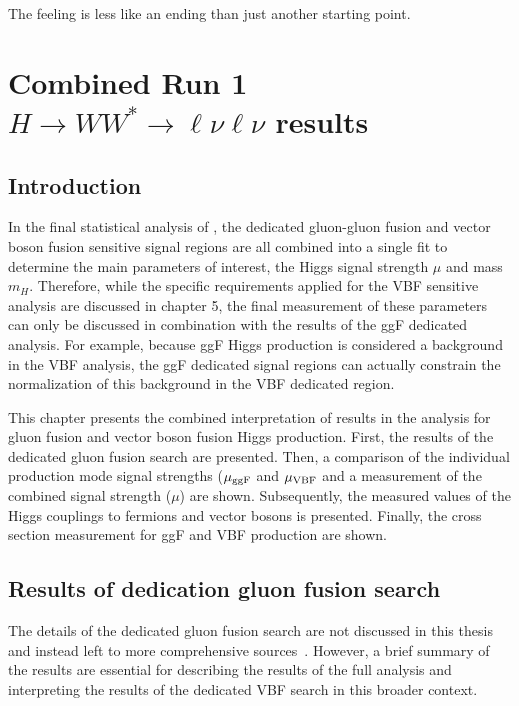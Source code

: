 \begin{savequote}[75mm]
The feeling is less like an ending than just another starting point.
\end{savequote}

\chapter{Combined Run 1 $H\rightarrow WW^{*}\rightarrow \ell\nu\ell\nu$ results}

\section{Introduction}

In the final statistical analysis of \HWWfull, the dedicated gluon-gluon fusion and vector boson fusion sensitive signal regions are all combined into a single fit to determine the main parameters of interest, the Higgs signal strength $\mu$ and mass $m_H$. Therefore, while the specific requirements applied for the VBF sensitive analysis are discussed in chapter 5, the final measurement of these parameters can only be discussed in combination with the results of the ggF dedicated analysis. For example, because ggF Higgs production is considered a background in the VBF analysis, the ggF dedicated signal regions can actually constrain the normalization of this background in the VBF dedicated region.

This chapter presents the combined interpretation of results in the \HWWfull analysis for gluon fusion and vector boson fusion Higgs production. First, the results of the dedicated gluon fusion search are presented. Then, a comparison of the individual production mode signal strengths ($\mu_{{\rm ggF}}$ and $\mu_{{\rm VBF}}$ and a measurement of the combined signal strength ($\mu$) are shown. Subsequently, the measured values of the Higgs couplings to fermions and vector bosons is presented. Finally, the cross section measurement for ggF and VBF production are shown. 

\section{Results of dedication gluon fusion \HWWfull search}

The details of the dedicated gluon fusion \HWWfull search are not discussed in this thesis and instead left to more comprehensive sources~\cite{WW2015}. However, a brief summary of the results are essential for describing the results of the full analysis and interpreting the results of the dedicated VBF search in this broader context. 

